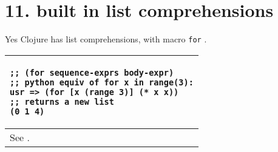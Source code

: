 \documentclass{standalone}
\begin{document}
\part{11. built in list comprehensions}

Yes Clojure has list comprehensions, with macro \texttt{for} \cite{empty}.

\begin{tabular}{|p{}|}
\hline
\begin{verbatim}
;; (for sequence-exprs body-expr)
;; python equiv of for x in range(3):
usr => (for [x (range 3)] (* x x))
;; returns a new list
(0 1 4)
\end{verbatim}
\\
\hline
See \cite{empty}.
\\
\hline
\end{tabular}
\end{document}
